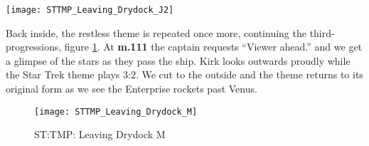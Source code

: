 \begin{figure*}
\texttt{[image: STTMP\_Leaving\_Drydock\_J2]}
	\caption{ST:TMP: Leaving Drydock J: Whole Tone Scale}
	\label{STTMP_Leaving_Drydock_J2}
\end{figure*}

Back inside, the restless theme is repeated once more, continuing the third-progressions, figure \ref{STTMP_Leaving_Drydock_M}. At \textbf{m.111} the captain requests ``Viewer ahead.'' and we get a glimpse of the stars as they pass the ship. Kirk looks outwards proudly while the Star Trek theme plays 3:2. We cut to the outside and the theme returns to its original form as we see the Enterprise rockets past Venus.

\begin{figure}
\center
\texttt{[image: STTMP\_Leaving\_Drydock\_M]}
	\caption{ST:TMP: Leaving Drydock M}
	\label{STTMP_Leaving_Drydock_M}
\end{figure}


\clearpage


